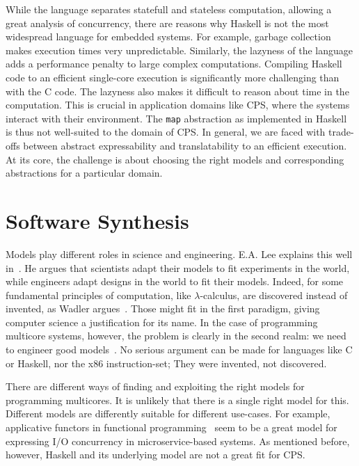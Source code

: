 While the language separates statefull and stateless computation, allowing a great analysis of concurrency, there are reasons why Haskell is not the most widespread language for embedded systems.
For example, garbage collection makes execution times very unpredictable.
Similarly, the lazyness of the language adds a performance penalty to large complex computations.
Compiling Haskell code to an efficient single-core execution is significantly more challenging than with the C code.
The lazyness also makes it difficult to reason about time in the computation.
This is crucial in application domains like \ac{CPS}, where the systems interact with their environment.
The \texttt{map} abstraction as implemented in Haskell is thus not well-suited to the domain of \ac{CPS}.
In general, we are faced with trade-offs between abstract expressability and translatability to an efficient execution.
At its core, the challenge is about choosing the right models and corresponding abstractions for a particular domain.

\section{Software Synthesis}

Models play different roles in science and engineering.
E.A. Lee explains this well in~\cite{lee2017plato}.
He argues that scientists adapt their models to fit experiments in the world, while engineers adapt designs in the world to fit their models.
Indeed, for some fundamental principles of computation, like $\lambda$-calculus, are discovered instead of invented, as Wadler argues~\cite{wadler2015propositions}.
Those might fit in the first paradigm, giving computer science a justification for its name.
In the case of programming multicore systems, however, the problem is clearly in the second realm: we need to engineer good models~\cite{lee2006problem}.
No serious argument can be made for languages like C or Haskell, nor the x86 instruction-set; They were invented, not discovered.

There are different ways of finding and exploiting the right models for programming multicores.
It is unlikely that there is a single right model for this.
Different models are differently suitable for different use-cases. 
For example, applicative functors in functional programming~\cite{marlow2014haxl} seem to be a great model for expressing \acs{I/O} concurrency in microservice-based systems.
As mentioned before, however, Haskell and its underlying model are not a great fit for \ac{CPS}.

